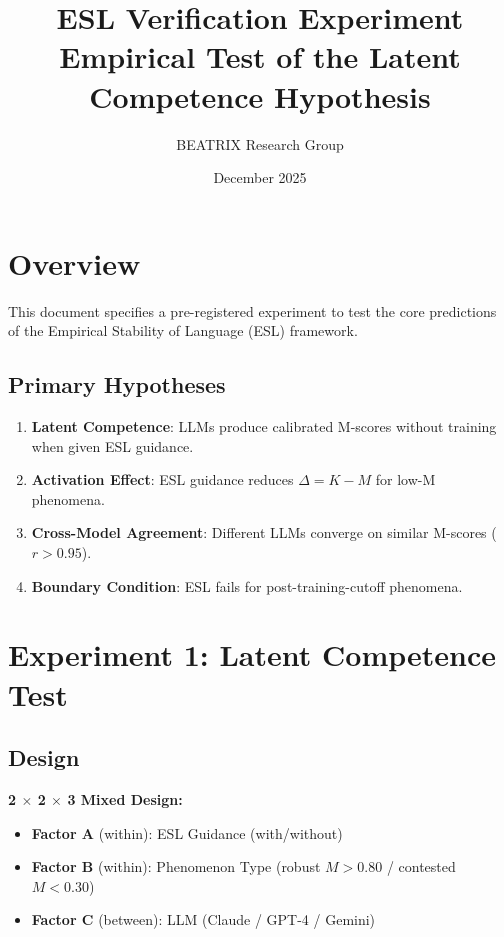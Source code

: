 \documentclass[11pt,a4paper]{article}
\title{\textbf{ESL Verification Experiment}\\
\Large Empirical Test of the Latent Competence Hypothesis}
\author{BEATRIX Research Group}
\date{December 2025}
\begin{document}
\maketitle

\section{Overview}

This document specifies a pre-registered experiment to test the core predictions of the Empirical Stability of Language (ESL) framework.

\subsection{Primary Hypotheses}

\begin{enumerate}
    \item[\textbf{H1}] \textbf{Latent Competence}: LLMs produce calibrated M-scores without training when given ESL guidance.
    \item[\textbf{H2}] \textbf{Activation Effect}: ESL guidance reduces $\Delta = K - M$ for low-M phenomena.
    \item[\textbf{H3}] \textbf{Cross-Model Agreement}: Different LLMs converge on similar M-scores ($r > 0.95$).
    \item[\textbf{H4}] \textbf{Boundary Condition}: ESL fails for post-training-cutoff phenomena.
\end{enumerate}


\section{Experiment 1: Latent Competence Test}

\subsection{Design}

\textbf{2 $\times$ 2 $\times$ 3 Mixed Design:}
\begin{itemize}
    \item \textbf{Factor A} (within): ESL Guidance (with/without)
    \item \textbf{Factor B} (within): Phenomenon Type (robust $M > 0.80$ / contested $M < 0.30$)
    \item \textbf{Factor C} (between): LLM (Claude / GPT-4 / Gemini)
\end{itemize}
\end{document}
